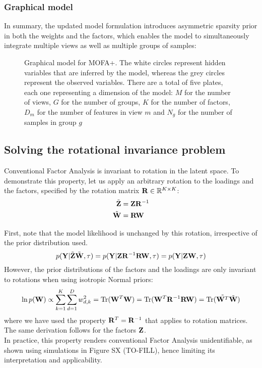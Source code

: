 \subsubsection{Graphical model}

In summary, the updated model formulation introduces asymmetric sparsity prior in both the weights and the factors, which enables the model to simultaneously integrate multiple views as well as multiple groups of samples:

\begin{figure}[H]
	\begin{center}
		
		\caption{Graphical model for MOFA+. The white circles represent hidden variables that are inferred by the model, whereas the grey circles represent the observed variables. There are a total of five plates, each one representing a dimension of the model: $M$ for the number of views, $G$ for the number of groups, $K$ for the number of factors, $D_m$ for the number of features in view $m$ and $N_g$ for the number of samples in group $g$ }\label{fig:MOFA2}
	\end{center}
\end{figure}


\subsection{Solving the rotational invariance problem}

Conventional Factor Analysis is invariant to rotation in the latent space\cite{Zhao2009}. To demonstrate this property, let us apply an arbitrary rotation to the loadings and the factors, specified by the rotation matrix ${\bf R} \in \mathbb{R}^{K \times K}$:
\begin{align*}
		\tilde{{\bf Z}} &= {\bf Z} {\bf R}^{-1} \\
		\tilde{{\bf W}} &= {\bf R} {\bf W}
\end{align*}

First, note that the model likelihood is unchanged by this rotation, irrespective of the prior distribution used.
\begin{equation*}
		p({\bf Y} | \tilde{{\bf Z}} \tilde{{\bf W}}, \tau) = p({\bf Y} | {\bf Z} {\bf R}^{-1} {\bf R} {\bf W}, \tau) = p({\bf Y} | {\bf Z} {\bf W}, \tau)
\end{equation*}
However, the prior distributions of the factors and the loadings are only invariant to rotations when using isotropic Normal priors:
\begin{equation*}
	\ln p({\bf W}) \propto \sum_{k=1}^{K} \sum_{d=1}^{D} w_{d,k}^2 = \mathrm{Tr}({\bf W}^T {\bf W}) = \mathrm{Tr}({\bf W}^T {\bf R}^{-1} {\bf R} {\bf W}) = \mathrm{Tr}(\tilde{{\bf W}^T} \tilde{{\bf W}})
\end{equation*}
where we have used the property ${\bf R}^{T} = {\bf R}^{-1}$ that applies to rotation matrices. The same derivation follows for the factors ${\bf Z}$.\\
In practice, this property renders conventional Factor Analysis unidentifiable, as shown using simulations in Figure SX (TO-FILL), hence limiting its interpretation and applicability.\\

